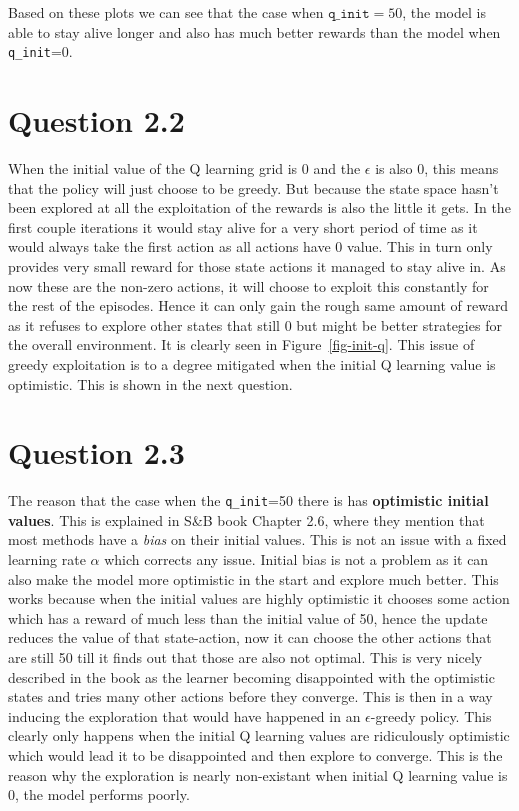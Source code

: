 \documentclass[a4paper]{article}
\begin{document}
Based on these plots we can see that the case when $\texttt{q\_init}=50$, the model is able to stay alive longer and also has much better rewards than the model when \texttt{q\_init}=0. 
\section*{Question 2.2}
When the initial value of the Q learning grid is 0 and the $\epsilon$ is also $0$, this means that the policy will just choose to be greedy. But because the state space hasn't been explored at all the exploitation of the rewards is also the little it gets. In the first couple iterations it would stay alive for a very short period of time as it would always take the first action as all actions have 0 value. This in turn only provides very small reward for those state actions it managed to stay alive in. As now these are the non-zero actions, it will choose to exploit this constantly for the rest of the episodes. Hence it can only gain the rough same amount of reward as it refuses to explore other states that still 0 but might be better strategies for the overall environment. It is clearly seen in Figure~\ref{fig-init-q}. This issue of greedy exploitation is to a degree mitigated when the initial Q learning value is optimistic. This is shown in the next question.
\section*{Question 2.3}
The reason that the case when the \texttt{q\_init}=50 there is has \textbf{optimistic initial values}. This is explained in S\&B book Chapter 2.6, where they mention that most methods have a \textit{bias} on their initial values. This is not an issue with a fixed learning rate $\alpha$ which corrects any issue. Initial bias is not a problem as it can also make the model more optimistic in the start and explore much better. This works because when the initial values are highly optimistic it chooses some action which has a reward of much less than the initial value of 50, hence the update reduces the value of that state-action, now it can choose the other actions that are still 50 till it finds out that those are also not optimal. This is very nicely described in the book as the learner becoming disappointed with the optimistic states and tries many other actions before they converge. This is then in a way inducing the exploration that would have happened in an $\epsilon$-greedy policy. This clearly only happens when the initial Q learning values are ridiculously optimistic which would lead it to be disappointed and then explore to converge. This is the reason why the exploration is nearly non-existant when initial Q learning value is 0, the model performs poorly.
\end{document}
